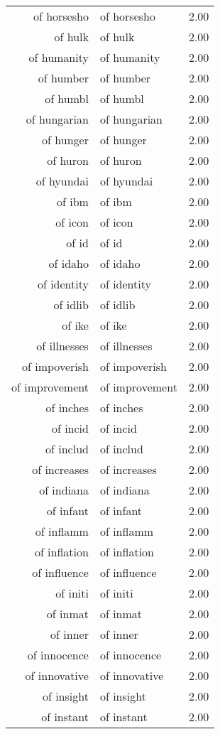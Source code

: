 \begin{table}[ht]
\begin{tabular}{rlr}
  of horsesho & of horsesho & 2.00 \\ 
  of hulk & of hulk & 2.00 \\ 
  of humanity & of humanity & 2.00 \\ 
  of humber & of humber & 2.00 \\ 
  of humbl & of humbl & 2.00 \\ 
  of hungarian & of hungarian & 2.00 \\ 
  of hunger & of hunger & 2.00 \\ 
  of huron & of huron & 2.00 \\ 
  of hyundai & of hyundai & 2.00 \\ 
  of ibm & of ibm & 2.00 \\ 
  of icon & of icon & 2.00 \\ 
  of id & of id & 2.00 \\ 
  of idaho & of idaho & 2.00 \\ 
  of identity & of identity & 2.00 \\ 
  of idlib & of idlib & 2.00 \\ 
  of ike & of ike & 2.00 \\ 
  of illnesses & of illnesses & 2.00 \\ 
  of impoverish & of impoverish & 2.00 \\ 
  of improvement & of improvement & 2.00 \\ 
  of inches & of inches & 2.00 \\ 
  of incid & of incid & 2.00 \\ 
  of includ & of includ & 2.00 \\ 
  of increases & of increases & 2.00 \\ 
  of indiana & of indiana & 2.00 \\ 
  of infant & of infant & 2.00 \\ 
  of inflamm & of inflamm & 2.00 \\ 
  of inflation & of inflation & 2.00 \\ 
  of influence & of influence & 2.00 \\ 
  of initi & of initi & 2.00 \\ 
  of inmat & of inmat & 2.00 \\ 
  of inner & of inner & 2.00 \\ 
  of innocence & of innocence & 2.00 \\ 
  of innovative & of innovative & 2.00 \\ 
  of insight & of insight & 2.00 \\ 
  of instant & of instant & 2.00 \\ 

\end{tabular}
\end{table}

